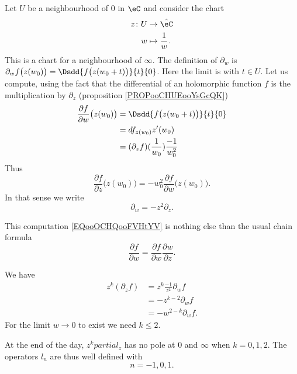 Let \( U\) be a neighbourhood of \( 0\) in \( \eC\) and consider the chart 
\begin{equation}
    \begin{aligned}
        z\colon U&\to \hat \eC \\
        w&\mapsto \frac{1}{ w }. 
    \end{aligned}
\end{equation}
This is a chart for a neighbourhood of \( \infty\). The definition of \( \partial_w\) is \( \partial_wf\big( z(w_0) \big)=\Dsdd{ f\big( z(w_0+t) \big) }{t}{0}  \). Here the limit is with \( t\in U\). Let us compute, using the fact that the differential of an holomorphic function \( f\) is the multiplication by \( \partial_z\) (proposition \ref{PROPooCHUEooYsGcQK})
\begin{subequations}        \label{EQooOCHQooFVHtYV}
    \begin{align}
        \frac{ \partial f }{ \partial w }\big( z(w_0) \big)&=\Dsdd{ f\big( z(w_0+t) \big) }{t}{0}\\
        &=df_{z(w_0)}z'(w_0)\\
        &=(\partial_zf)(\frac{1}{ w_0 })\frac{ -1 }{ w_0^2 }
    \end{align}
\end{subequations}
Thus 
\begin{equation}
    \frac{ \partial f }{ \partial z }\big( z(w_0) \big)=-w_0^2\frac{ \partial f }{ \partial w }\big( z(w_0) \big).
\end{equation}
In that sense we write
\begin{equation}
    \partial_w=-z^2\partial_z.
\end{equation}

\begin{remark}
    This computation \eqref{EQooOCHQooFVHtYV} is nothing else than the usual chain formula
    \begin{equation}
        \frac{ \partial f }{ \partial w }=\frac{ \partial f }{ \partial w }\frac{ \partial w }{ \partial z }.
    \end{equation}
\end{remark}

We have 
\begin{subequations}
    \begin{align}
        z^k(\partial_zf)&=z^k\frac{-1}{ z^2 }\partial_wf\\
        &=-z^{k-2}\partial_wf\\
        &=-w^{2-k}\partial_wf.
    \end{align}
\end{subequations}
For the limit \( w\to 0\) to exist we need \( k\leq 2\).

At the end of the day, \( z^kpartial_z\) has no pole at \( 0\) and \( \infty\) when \( k=0,1,2\). The operators \( l_n\) are thus well defined with
\begin{equation}
    n=-1,0,1.
\end{equation}
